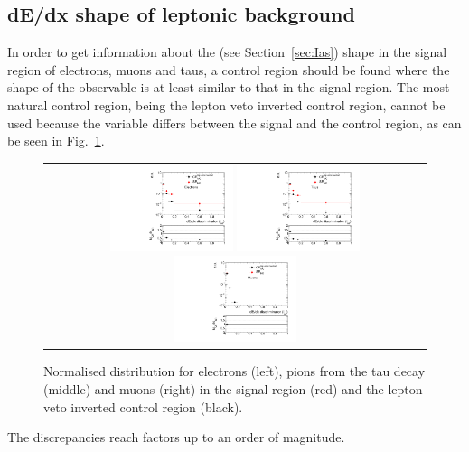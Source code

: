 \FloatBarrier
\subsection{dE/dx shape of leptonic background}
In order to get information about the \ias (see Section~\ref{sec:Ias}) shape in the signal region of electrons, muons and taus, a control region should be found where the shape of the observable is at least similar to that in the
signal region.
The most natural control region, being the lepton veto inverted control region, cannot be used because the variable \ias differs between the signal and the control region, as can be seen in Fig.~\ref{fig:LeptonIasDist}.
\begin{figure}[!b]
  \centering 
  \begin{tabular}{c}
    \includegraphics[width=0.33\textwidth]{figures/analysis/Background/hASmi_Electrons_MCCR_MCSR.pdf}
    \includegraphics[width=0.33\textwidth]{figures/analysis/Background/hASmi_Taus_MCCR_MCSR.pdf}
    \includegraphics[width=0.33\textwidth]{figures/analysis/Background/hASmi_Muons_MCCR_MCSR.pdf}
  \end{tabular}
  \caption{Normalised \ias distribution for electrons (left), pions from the tau decay (middle) and muons (right) in the signal region (red) and the lepton veto inverted control region (black).}
  \label{fig:LeptonIasDist}
\end{figure}
The discrepancies reach factors up to an order of magnitude.


